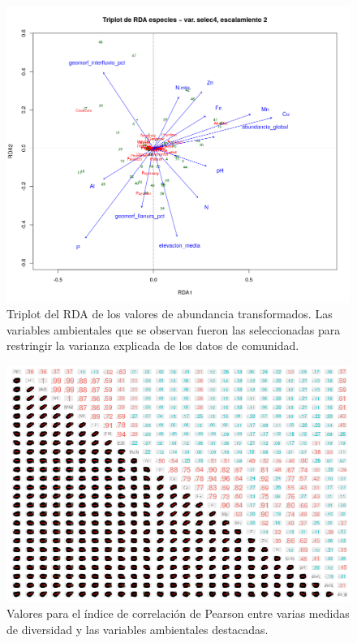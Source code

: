 \documentclass[11pt,]{article}
\begin{document}
\begin{figure}
\centering
\includegraphics{rda_triplot_var_selec_4_escal2.png}
\caption{Triplot del RDA de los valores de abundancia transformados. Las
variables ambientales que se observan fueron las seleccionadas para
restringir la varianza explicada de los datos de comunidad.
\label{fig:rda_triplot_var_selec_4_escal2}}
\end{figure}

\begin{figure}
\centering
\includegraphics{panel_cor_indcs_diversidad1_columnas_quitadas.png}
\caption{Valores para el índice de correlación de Pearson entre varias
medidas de diversidad y las variables ambientales destacadas.
\label{fig:panel_cor_indics_diversidad1_columnnas_quitadas}}
\end{figure}
\end{document}
